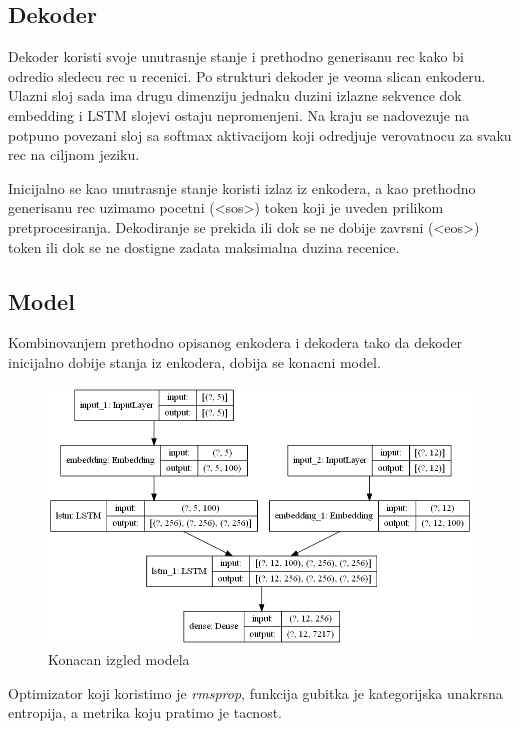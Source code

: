 \documentclass[a4paper]{article}
\begin{document}
\subsection{Dekoder}
Dekoder koristi svoje unutrasnje stanje i prethodno generisanu rec kako bi odredio sledecu rec u recenici. Po strukturi dekoder je veoma slican enkoderu. Ulazni sloj sada ima drugu dimenziju jednaku duzini izlazne sekvence dok embedding i LSTM slojevi ostaju nepromenjeni. Na kraju se nadovezuje na potpuno povezani sloj sa softmax aktivacijom koji odredjuje verovatnocu za svaku rec na ciljnom jeziku.

Inicijalno se kao unutrasnje stanje koristi izlaz iz enkodera, a kao prethodno generisanu rec uzimamo pocetni (\textless sos\textgreater) token koji je uveden prilikom pretprocesiranja. Dekodiranje se prekida ili dok se ne dobije zavrsni (\textless eos\textgreater) token ili dok se ne dostigne zadata maksimalna duzina recenice.

\subsection{Model}

Kombinovanjem prethodno opisanog enkodera i dekodera tako da dekoder inicijalno dobije stanja iz enkodera, dobija se konacni model.

\begin{figure}[h!]
  \centering
    \includegraphics[width=\textwidth]{model}
  \caption{Konacan izgled modela}
  \label{fig:model}
\end{figure}

Optimizator koji koristimo je \textit{rmsprop}, funkcija gubitka je kategorijska unakrsna entropija, a metrika koju pratimo je tacnost.
\end{document}
